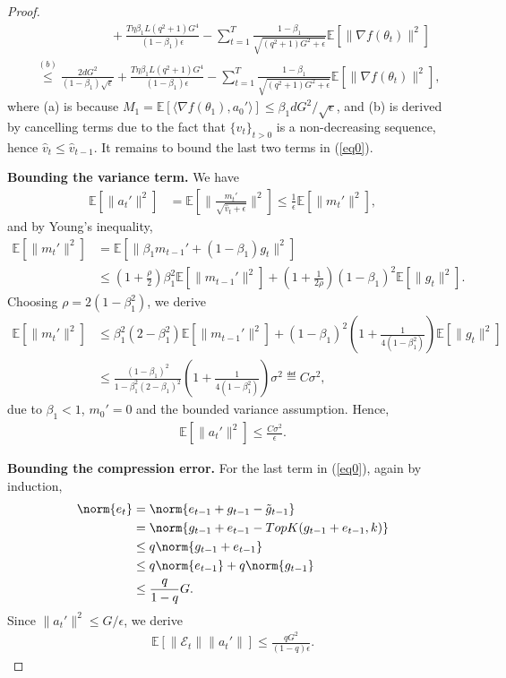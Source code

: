 \documentclass[11pt]{article}
\begin{document}
\begin{proof}
\begin{align*}
    &\hspace{1in} + \frac{T \eta\beta_1 L(q^2+1)G^4}{(1-\beta_1)\epsilon}-\sum_{t=1}^T \frac{1-\beta_1}{\sqrt{(q^2+1)G^2+\epsilon}}\mathbb E[\|\nabla f(\theta_t)\|^2]\\
    &\overset{(b)}{\leq} \frac{2dG^2}{(1-\beta_1)\sqrt\epsilon}+ \frac{T \eta\beta_1 L(q^2+1)G^4}{(1-\beta_1)\epsilon}-\sum_{t=1}^T \frac{1-\beta_1}{\sqrt{(q^2+1)G^2+\epsilon}}\mathbb E[\|\nabla f(\theta_t)\|^2],
\end{align*}
where (a) is because $M_1=\mathbb E[\langle\nabla f(\theta_1),a_0'\rangle]\leq \beta_1 d G^2/\sqrt{\epsilon}$, and (b) is derived by cancelling terms due to the fact that $\{\hat v_{t}\}_{t>0}$ is a non-decreasing sequence, hence $\hat v_{t}\leq \hat v_{t-1}$. 
It remains to bound the last two terms in (\ref{eq0}).

\textbf{Bounding the variance term.} We have
\begin{align*}
    \mathbb E[\|a_t'\|^2]&=\mathbb E[\|\frac{m_t'}{\sqrt{\hat v_t+\epsilon}}\|^2]\leq \frac{1}{\epsilon}\mathbb E[\|m_t'\|^2],
\end{align*}
and by Young's inequality,
\begin{align*}
    \mathbb E[\|m_t'\|^2]&=\mathbb E[\|\beta_1m_{t-1}'+(1-\beta_1)g_t\|^2]\\
    &\leq (1+\frac{\rho}{2})\beta_1^2 \mathbb E[\|m_{t-1}'\|^2]+(1+\frac{1}{2\rho})(1-\beta_1)^2 \mathbb E[\|g_t\|^2].
\end{align*}
Choosing $\rho=2(1-\beta_1^2)$, we derive
\begin{align*}
    \mathbb E[\|m_t'\|^2]&\leq \beta_1^2(2-\beta_1^2)\mathbb E[\|m_{t-1}'\|^2]+(1-\beta_1)^2(1+\frac{1}{4(1-\beta_1^2)})\mathbb E[\|g_t\|^2]\\
    &\leq \frac{(1-\beta_1)^2}{1-\beta_1^2(2-\beta_1)^2}(1+\frac{1}{4(1-\beta_1^2)})\sigma^2\eqdef C\sigma^2,
\end{align*}
due to $\beta_1<1$, $m_0'=0$ and the bounded variance assumption. Hence,
\begin{align*}
    \mathbb E[\|a_t'\|^2]\leq \frac{C\sigma^2}{\epsilon}.
\end{align*}

\textbf{Bounding the compression error.} For the last term in (\ref{eq0}), again by induction,
\begin{equation}\label{eq:ineqe_t}
\begin{split}
\norm{e_t} & = \norm{e_{t-1} + g_{t-1} - \tilde g_{t-1}}\\
& =  \norm{ g_{t-1} + e_{t-1} - TopK(g_{t-1}+e_{t-1},k)}\\
& \leq q \norm{g_{t-1} + e_{t-1}}\\
& \leq q \norm{ e_{t-1}}+ q \norm{g_{t-1}}\\
& \leq \frac{q}{1-q}G.
\end{split}
\end{equation}
Since $\|a_t'\|^2\leq G/\epsilon$, we derive
\begin{align*}
    \mathbb E[\| \mathcal E_t\| \|a_t'\|]\leq \frac{qG^2}{(1-q)\epsilon}.
\end{align*}


\end{proof}
\end{document}
